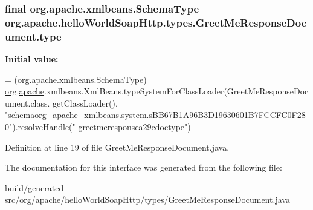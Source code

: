 \subsubsection[{type}]{\setlength{\rightskip}{0pt plus 5cm}final org.\+apache.\+xmlbeans.\+Schema\+Type org.\+apache.\+hello\+World\+Soap\+Http.\+types.\+Greet\+Me\+Response\+Document.\+type\hspace{0.3cm}{\ttfamily [static]}}\label{interfaceorg_1_1apache_1_1hello_world_soap_http_1_1types_1_1_greet_me_response_document_ad78b22f7761b99916e1b745cb00154d4}
{\bfseries Initial value\+:}
\begin{DoxyCode}
= (\hyperlink{namespaceorg}{org}.\hyperlink{namespaceorg_1_1apache}{apache}.xmlbeans.SchemaType)
        \hyperlink{namespaceorg}{org}.\hyperlink{namespaceorg_1_1apache}{apache}.xmlbeans.XmlBeans.typeSystemForClassLoader(GreetMeResponseDocument.class.
      getClassLoader(), \textcolor{stringliteral}{"schemaorg\_apache\_xmlbeans.system.sBB67B1A96B3D19630601B7FCCFC0F280"}).resolveHandle(\textcolor{stringliteral}{"
      greetmeresponsea29cdoctype"})
\end{DoxyCode}


Definition at line 19 of file Greet\+Me\+Response\+Document.\+java.



The documentation for this interface was generated from the following file\+:\begin{DoxyCompactItemize}
\item 
build/generated-\/src/org/apache/hello\+World\+Soap\+Http/types/Greet\+Me\+Response\+Document.\+java\end{DoxyCompactItemize}

